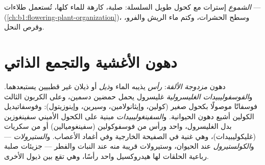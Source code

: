 \begin{definition}[الشموع]\label{def:b1:lipids:wax}
\emph{الشموع} إسترات  مع كحول طويل السلسلة: صلبة،
كارهة للماء كلها، تُستعمل طلاءات ---  
(\cref{ch:b1:flowering-plant-organization})، وسطح الحشرات، وكتم ماء
الريش والفرو، وقرص النحل.
\end{definition}

\section{دهون الأغشية والتجمع الذاتي}

\begin{definition}\label{def:b1:lipids:amphiphilic}
دهون  \emph{مزدوجة الألفة}:
\emph{رأس}  يذيبه الماء و\emph{ذيل} أو ذيلان غير قطبيين
يستبعدهما. و\emph{الفوسفوليبيدات الغليسرولية}
غليسرول يحمل حمضين دسمين، وعلى الكربون الثالث فوسفاتًا موصولًا بكحول
 صغير (كولين، وإيثانولامين، وسيرين، وإينوزيتول): وفوسفاتيديل
الكولين أشيع دهون  الحيوانية.
و\emph{السفينغوليبيدات} مبنية على الكحول الأميني
سفينغوزين بدل الغليسرول،  واحد ورأس من فوسفوكولين
(سفينغوميالين) أو من سكريات (غليكوليبيدات)، وهي غنية في الصفيحة
الخارجية وفي أغماد الأعصاب. و\emph{الستيرولات} ---
و\emph{الكولستيرول} عند الحيوان، وستيرولات قريبة
منه عند النبات والفطر --- جزيئات صلبة رباعية الحلقات لها هيدروكسيل
واحد رأسًا، وهي تقع بين ذيول  الأخرى.
\end{definition}


